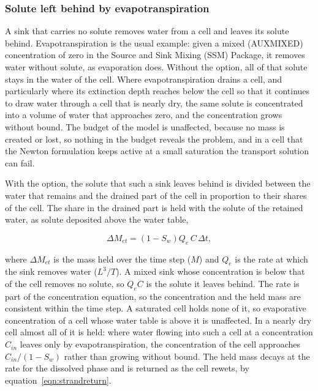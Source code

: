 \subsubsection{Solute left behind by evapotranspiration}

A sink that carries no solute removes water from a cell and leaves its solute behind. Evapotranspiration is the usual example: given a mixed (AUXMIXED) concentration of zero in the Source and Sink Mixing (SSM) Package, it removes water without solute, as evaporation does. Without the option, all of that solute stays in the water of the cell. Where evapotranspiration drains a cell, and particularly where its extinction depth reaches below the cell so that it continues to draw water through a cell that is nearly dry, the same solute is concentrated into a volume of water that approaches zero, and the concentration grows without bound. The budget of the model is unaffected, because no mass is created or lost, so nothing in the budget reveals the problem, and in a cell that the Newton formulation keeps active at a small saturation the transport solution can fail.

With the option, the solute that such a sink leaves behind is divided between the water that remains and the drained part of the cell in proportion to their shares of the cell. The share in the drained part is held with the solute of the retained water, as solute deposited above the water table,

\begin{equation}
\label{eqn:strandet}
\Delta M_{et} = \left ( 1 - S_w \right ) Q_e \, C \, \Delta t ,
\end{equation}

\noindent where $\Delta M_{et}$ is the mass held over the time step ($M$) and $Q_e$ is the rate at which the sink removes water ($L^3/T$). A mixed sink whose concentration is below that of the cell removes no solute, so $Q_e C$ is the solute it leaves behind. The rate is part of the concentration equation, so the concentration and the held mass are consistent within the time step. A saturated cell holds none of it, so evaporative concentration of a cell whose water table is above it is unaffected. In a nearly dry cell almost all of it is held: where water flowing into such a cell at a concentration $C_{in}$ leaves only by evapotranspiration, the concentration of the cell approaches $C_{in}/(1 - S_w)$ rather than growing without bound. The held mass decays at the rate for the dissolved phase and is returned as the cell rewets, by equation~\ref{eqn:strandreturn}.

